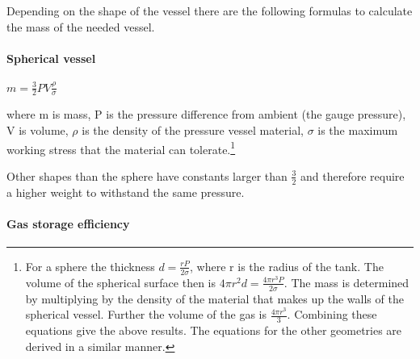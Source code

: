 \documentclass[main]{subfiles}
\begin{document}
Depending on the shape of the vessel there are the following formulas to calculate the mass of the needed vessel.

\paragraph{Spherical vessel}

$m = \frac{3}{2}PV\frac{\rho}{\sigma}$

where m is mass, P is the pressure difference from ambient (the gauge pressure), V is volume, $\rho$ is the density of the pressure vessel material, $\sigma$ is the maximum working stress that the material can tolerate.\footnote{For a sphere the thickness $d = \frac{rP}{2\sigma}$, where r is the radius of the tank. The volume of the spherical surface then is $4\pi r^2d = \frac{4\pi r^3P}{2\sigma}$. The mass is determined by multiplying by the density of the material that makes up the walls of the spherical vessel. Further the volume of the gas is $\frac{4\pi r^3}{3}$. Combining these equations give the above results. The equations for the other geometries are derived in a similar manner.}

Other shapes than the sphere have constants larger than $\frac{3}{2}$ and therefore require a higher weight to withstand the same pressure.
\begin{comment}
\paragraph{Cylindrical vessel with hemispherical ends}

The shape called capsule or a cylinder with hemispherical ends the formula is the following:

$m = 2 \pi R^2 (R + W) P \frac{\rho}{\sigma}$

where R is the radius W is the middle cylinder width only, and the overall width is W + 2R.

\paragraph{Cylindrical vessel with semi-elliptical ends}

In a vessel with an aspect ratio of middle cylinder width to radius of 2:1, we have a formula:

$m = 6 \pi R^3 P \frac{\rho}{\sigma}$. 
\end{comment}
\paragraph{Gas storage efficiency}
\end{document}
